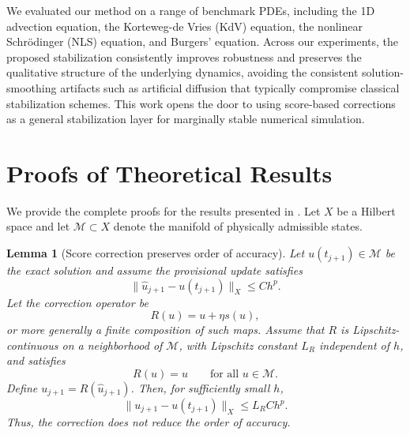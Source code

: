 \documentclass[letterpaper]{article} %
\newtheorem{lemma}{Lemma}
\begin{document}
We evaluated our method on a range of benchmark PDEs, including the 1D advection equation, the Korteweg-de Vries (KdV) equation, the nonlinear Schrödinger (NLS) equation, and Burgers' equation. Across our experiments, the proposed stabilization consistently improves robustness and preserves the qualitative structure of the underlying dynamics, avoiding the consistent solution-smoothing artifacts such as artificial diffusion that typically compromise classical stabilization schemes. This work opens the door to using score-based corrections as a general stabilization layer for marginally stable numerical simulation.





% 


\onecolumn
\appendix



\setcounter{theorem}{0}
\setcounter{lemma}{0}

\renewcommand{\thetheorem}{\Alph{section}.\arabic{theorem}}
\renewcommand{\thelemma}{\Alph{section}.\arabic{lemma}}


\section{Proofs of Theoretical Results}
We provide the complete proofs for the results presented in .
Let $X$ be a Hilbert space and let $\mathcal{M}\subset X$ denote the
manifold of physically admissible states.

\begin{lemma}[Score correction preserves order of accuracy]
Let $u(t_{j+1})\in\mathcal{M}$ be the exact solution and assume the provisional
update satisfies
\[
\|\widehat{u}_{j+1}-u(t_{j+1})\|_X \le Ch^p .
\]
Let the correction operator be
\[
R(u) = u + \eta s(u),
\]
or more generally a finite composition of such maps. Assume that $R$ is
Lipschitz-continuous on a neighborhood of $\mathcal{M}$, with Lipschitz
constant $L_R$ independent of $h$, and satisfies
\[
R(u)=u
\qquad \text{for all } u\in\mathcal{M}.
\]
Define $u_{j+1}=R(\widehat{u}_{j+1})$. Then, for sufficiently small $h$,
\[
\|u_{j+1}-u(t_{j+1})\|_X \le L_R C h^p .
\]
Thus, the correction does not reduce the order of accuracy.
\end{lemma}
\end{document}
